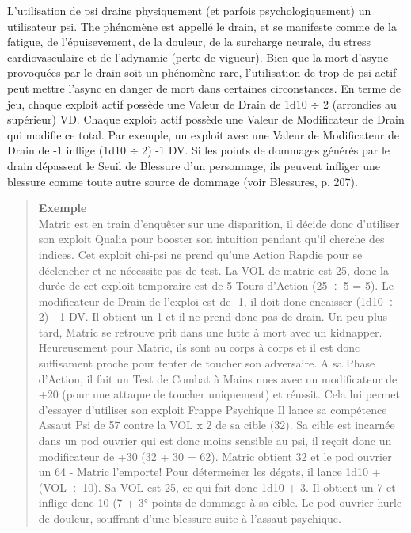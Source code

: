 L'utilisation de psi draine physiquement (et parfois psychologiquement)  un utilisateur psi. The phénomène est appellé le drain, et se manifeste comme de la fatigue, de l'épuisevement, de la douleur, de la surcharge neurale, du stress cardiovasculaire et de l'adynamie (perte de vigueur). Bien que la mort d'async provoquées par le drain soit un phénomène rare, l'utilisation de trop de psi actif peut mettre l'async en danger de mort dans certaines circonstances. En terme de jeu, chaque exploit actif possède une Valeur de Drain de 1d10 $\div$ 2 (arrondies au supérieur) VD. Chaque exploit actif possède une Valeur de Modificateur de Drain qui modifie ce total. Par exemple, un exploit avec une Valeur de Modificateur de Drain de -1 inflige (1d10 $\div$ 2) -1 DV. Si les points de dommages générés par le drain dépassent le Seuil de Blessure d'un personnage, ils peuvent infliger une blessure comme toute autre source de dommage (voir Blessures, p. 207). 

\begin{quotation} \textbf{Exemple} \\ Matric est en train d'enquêter sur une disparition, il décide donc d'utiliser son exploit Qualia pour booster son intuition pendant qu'il cherche des indices. Cet exploit chi-psi ne prend qu'une Action Rapdie pour se déclencher et ne nécessite pas de test. La VOL de matric est 25, donc la durée de cet exploit temporaire est de 5 Tours d'Action (25 $\div$ 5 = 5). Le modificateur de Drain de l'exploi est de -1, il doit donc encaisser (1d10 $\div$ 2) - 1 DV. Il obtient un 1 et il ne prend donc pas de drain. Un peu plus tard, Matric se retrouve prit dans une lutte à mort avec un kidnapper. Heureusement pour Matric, ils sont au corps à corps et il est donc suffisament proche pour tenter de toucher son adversaire. A sa Phase d'Action, il fait un Test de Combat à Mains nues avec un modificateur de +20 (pour une attaque de toucher uniquement) et réussit. Cela lui permet d'essayer d'utiliser son exploit Frappe Psychique Il lance sa compétence Assaut Psi de 57 contre la VOL x 2 de sa cible (32). Sa cible est incarnée dans un pod ouvrier qui est donc moins sensible au psi, il reçoit donc un modificateur de +30 (32 + 30 = 62). Matric obtient 32 et le pod ouvrier un 64 - Matric l'emporte! Pour détermeiner les dégats, il lance 1d10 + (VOL $\div$ 10). Sa VOL est 25, ce qui fait donc 1d10 + 3. Il obtient un 7 et inflige donc 10 (7 + 3° points de dommage à sa cible. Le pod ouvrier hurle de douleur, souffrant d'une blessure suite à l'assaut psychique. 

\end{quotation} 

